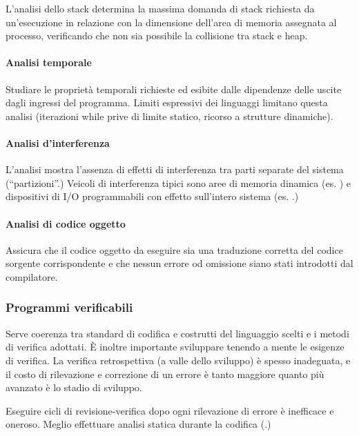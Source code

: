 L'analisi dello stack determina la massima domanda di stack richiesta da
un'esecuzione in relazione con la dimensione dell'area di memoria assegnata al
processo, verificando che non sia possibile la collisione tra stack e heap.

\paragraph{Analisi temporale}
\label{par:analisi_temporale}

Studiare le proprietà temporali richieste ed esibite dalle dipendenze delle
uscite dagli ingressi del programma. Limiti espressivi dei linguaggi limitano
questa analisi (iterazioni while prive di limite statico, ricorso a strutture
dinamiche).

\paragraph{Analisi d'interferenza}
\label{par:analisi_d_interferenza}

L'analisi mostra l'assenza di effetti di interferenza tra parti separate del
sistema (``partizioni''.) Veicoli di interferenza tipici sono aree di memoria
dinamica (es. ) e dispositivi di I/O programmabili con
effetto sull'intero sistema (es. .)

\paragraph{Analisi di codice oggetto}
\label{par:analisi_di_codice_oggetto}

Assicura che il codice oggetto da eseguire sia una traduzione corretta del
codice sorgente corrispondente e che nessun errore od omissione siano stati
introdotti dal compilatore.

\subsubsection{Programmi verificabili}
\label{ssub:programmi_verificabili}

Serve coerenza tra standard di codifica e costrutti del linguaggio scelti e i
metodi di verifica adottati. \`E inoltre importante sviluppare tenendo a mente
le esigenze di verifica. La verifica retrospettiva (a valle dello sviluppo) è
spesso inadeguata, e il costo di rilevazione e correzione di un errore è tanto
maggiore quanto più avanzato è lo stadio di sviluppo.

Eseguire cicli di revisione-verifica dopo ogni rilevazione di errore è
inefficace e oneroso. Meglio effettuare analisi statica durante la codifica
(.)

